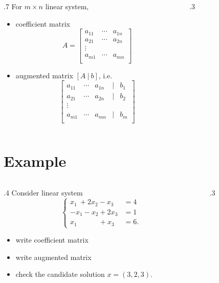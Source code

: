 \documentclass{beamer}
\theoremstyle{definition}
\theoremstyle{theorem}
\begin{document}
\begin{frame}
\begin{columns}
\begin{column}
 {.7\textwidth}
 For $m\times n$ linear system,
 \begin{itemize}
 \item   coefficient matrix
$$ A = 
\begin{bmatrix}
 a_{11} & \cdots & a_{1n} \\
 a_{21} & \cdots & a_{2n} \\
 \vdots\\
 a_{m1} & \cdots & a_{mn} \\
\end{bmatrix}
$$
\item augmented matrix 
$[A\  |\  b ]$, i.e. 
$$\begin{bmatrix}
 a_{11} & \cdots & a_{1n} & | & b_{1} \\
 a_{21} & \cdots & a_{2n} & | & b_{2} \\
 \vdots\\
 a_{m1} & \cdots & a_{mn} & | & b_{m} \\
\end{bmatrix}
$$
\end{itemize}

\end{column}
\begin{column}
 {.3\textwidth}
\end{column}
\end{columns}
\end{frame}

\section{Example}

\begin{frame}
 {}
\begin{columns}
\begin{column}
 {.4\textwidth}
Consider linear system
$$
\left\{
\begin{array}
 {ll}
  x_{1} \ + 2 x_{2} - x_{3} &= 4 \\
   - x_{1} - x_{2} +2 x_{3} &= 1 \\
  x_{1} \quad\quad\quad +  x_{3} &= 6 .
\end{array}
\right.
$$

 \begin{itemize}
 \item  write coefficient matrix
 \item write augmented matrix
 \item check the candidate solution $x = (3, 2, 3)$.
\end{itemize}

\end{column}
\begin{column}
 {.3\textwidth}
% 
\end{column}
\end{columns}
\end{frame}
\end{document}
